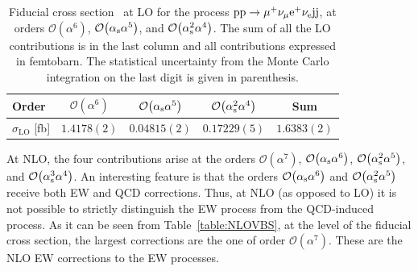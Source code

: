 \begin{table}
\begin{center}
\begin{tabular}{|l||c|c|c||c|}
\hline
Order & $\mathcal{O}{\left(\alpha^{6}\right)}$ & $\mathcal{O}{\left(\alpha_{\rm s}\alpha^{5}\right)}$ & $\mathcal{O}{\left(\alpha_{\rm s}^2\alpha^{4}\right)}$ & Sum \\
\hline
\hline
${\sigma_{\mathrm{LO}}}$ [fb] 
& $1.4178(2)$
& $0.04815(2)$
& $0.17229(5)$
& $1.6383(2)$ \\
\hline
\end{tabular}
\end{center}
\caption{
Fiducial cross section~\cite{Biedermann:2017bss} at LO for the process ${\rm p}{\rm p}\to\mu^+\nu_\mu{\rm e}^+\nu_{\rm e}{\rm j}{\rm j}$, at
orders  $\mathcal{O}{\left(\alpha^{6}\right)}$, $\mathcal{O}{\left(\alpha_{\rm s}\alpha^{5}\right)}$, and $\mathcal{O}{\left(\alpha_{\rm s}^2\alpha^{4}\right)}$.
The sum of all the LO contributions is in the last column and all contributions expressed in femtobarn. 
The statistical uncertainty from the Monte Carlo integration on the last digit is given in parenthesis.}
\label{table:LOVBS}
\end{table}

At NLO, the four contributions arise at the orders $\mathcal{O}{\left(\alpha^{7}\right)}$, $\mathcal{O}{\left(\alpha_{\rm s}\alpha^{6}\right)}$, $\mathcal{O}{\left(\alpha_{\rm s}^{2}\alpha^{5}\right)}$, and $\mathcal{O}{\left(\alpha_{\rm s}^{3}\alpha^{4}\right)}$. 
An interesting feature is that the orders $\mathcal{O}{\left(\alpha_{\rm s}\alpha^{6}\right)}$ and $\mathcal{O}{\left(\alpha_{\rm s}^{2}\alpha^{5}\right)}$ receive both EW and QCD corrections.
Thus, at NLO (as opposed to LO) it is not possible to strictly distinguish the EW process from the QCD-induced process.
As it can be seen from Table~\ref{table:NLOVBS}, at the level of the fiducial cross section, the largest corrections are the one of order $\mathcal{O}{\left(\alpha^{7}\right)}$.
These are the NLO EW corrections to the EW processes.

